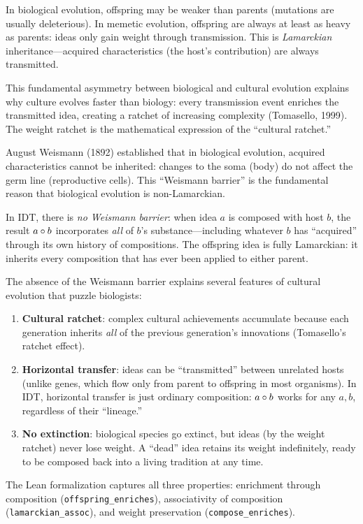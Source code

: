 \begin{interpretation}
\label{interp:lamarckian}
In biological evolution, offspring may be weaker than parents (mutations are
usually deleterious).  In memetic evolution, offspring are always at least as
heavy as parents: ideas only gain weight through transmission.  This is
\emph{Lamarckian} inheritance---acquired characteristics (the host's
contribution) are always transmitted.

This fundamental asymmetry between biological and cultural evolution explains
why culture evolves faster than biology: every transmission event enriches the
transmitted idea, creating a ratchet of increasing complexity (Tomasello, 1999).
The weight ratchet is the mathematical expression of the ``cultural ratchet.''
\end{interpretation}

\begin{remark}
\label{rem:lamarckian-ratchet}
August Weismann (1892) established that in biological evolution, acquired
characteristics cannot be inherited: changes to the soma (body) do not
affect the germ line (reproductive cells).  This ``Weismann barrier'' is the
fundamental reason that biological evolution is non-Lamarckian.

In IDT, there is \emph{no Weismann barrier}: when idea $a$ is composed with
host $b$, the result $a \circ b$ incorporates \emph{all} of $b$'s
substance---including whatever $b$ has ``acquired'' through its own history
of compositions.  The offspring idea is fully Lamarckian: it inherits every
composition that has ever been applied to either parent.

The absence of the Weismann barrier explains several features of cultural
evolution that puzzle biologists:
\begin{enumerate}
  \item \textbf{Cultural ratchet}: complex cultural achievements accumulate
        because each generation inherits \emph{all} of the previous
        generation's innovations (Tomasello's ratchet effect).
  \item \textbf{Horizontal transfer}: ideas can be ``transmitted'' between
        unrelated hosts (unlike genes, which flow only from parent to
        offspring in most organisms).  In IDT, horizontal transfer is just
        ordinary composition: $a \circ b$ works for any $a, b$, regardless
        of their ``lineage.''
  \item \textbf{No extinction}: biological species go extinct, but ideas
        (by the weight ratchet) never lose weight.  A ``dead'' idea retains
        its weight indefinitely, ready to be composed back into a living
        tradition at any time.
\end{enumerate}

The Lean formalization captures all three properties: enrichment through
composition (\texttt{offspring\_enriches}), associativity of composition
(\texttt{lamarckian\_assoc}), and weight preservation
(\texttt{compose\_enriches}).
\end{remark}


